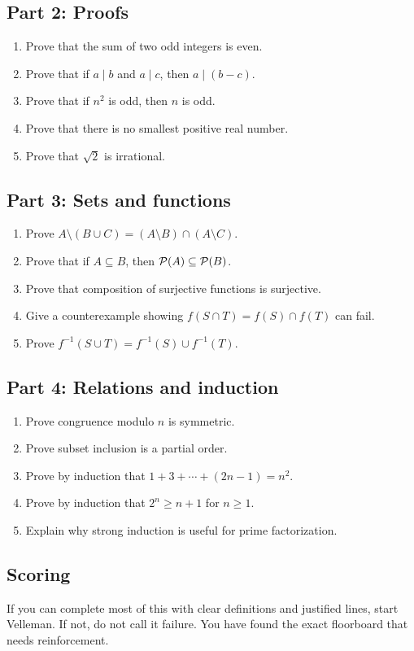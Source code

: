 \documentclass[12pt]{article}
\begin{document}
\subsection{Part 2: Proofs}

\begin{enumerate}
\item Prove that the sum of two odd integers is even.
\item Prove that if $a\mid b$ and $a\mid c$, then $a\mid(b-c)$.
\item Prove that if $n^2$ is odd, then $n$ is odd.
\item Prove that there is no smallest positive real number.
\item Prove that $\sqrt2$ is irrational.
\end{enumerate}

\subsection{Part 3: Sets and functions}

\begin{enumerate}
\item Prove $A\setminus(B\cup C)=(A\setminus B)\cap(A\setminus C)$.
\item Prove that if $A\subseteq B$, then $\mathcal{P}(A)\subseteq\mathcal{P}(B)$.
\item Prove that composition of surjective functions is surjective.
\item Give a counterexample showing $f(S\cap T)=f(S)\cap f(T)$ can fail.
\item Prove $f^{-1}(S\cup T)=f^{-1}(S)\cup f^{-1}(T)$.
\end{enumerate}

\subsection{Part 4: Relations and induction}

\begin{enumerate}
\item Prove congruence modulo $n$ is symmetric.
\item Prove subset inclusion is a partial order.
\item Prove by induction that $1+3+\cdots+(2n-1)=n^2$.
\item Prove by induction that $2^n\geq n+1$ for $n\geq1$.
\item Explain why strong induction is useful for prime factorization.
\end{enumerate}

\subsection{Scoring}

If you can complete most of this with clear definitions and justified lines, start Velleman. If not, do not call it failure. You have found the exact floorboard that needs reinforcement.
\end{document}
